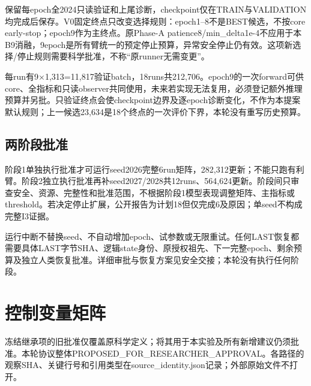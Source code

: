 \documentclass[UTF8,fontset=fandol,10pt]{ctexart}
\begin{document}
保留每epoch全2024只读验证和上尾诊断，checkpoint仅在TRAIN与VALIDATION均完成后保存。V0固定终点只改变选择规则：epoch1–8不是BEST候选，不按core early-stop；epoch9作为主终点。原Phase-A patience8/\allowbreak{}min\_\allowbreak{}delta1e-4不应用于本B9消融，9epoch是所有臂统一的预定停止预算，异常安全停止仍有效。这项新选择/\allowbreak{}停止规则需要科学批准，不称“原runner无需变更”。

每run有9\(\times\)1,313=11,817验证batch，18runs共212,706。epoch9的一次forward可供core、全指标和只读observer共同使用，未来若实现无法复用，必须登记额外推理预算并另批。只验证终点会使checkpoint边界及逐epoch诊断变化，不作为本提案默认规则；上一候选23,634是18个终点的一次评价下界，本轮没有重写历史预算。

\subsection{两阶段批准}

阶段1单独执行批准才可运行seed2026完整6run矩阵，282,312更新；不能只跑有利臂。阶段2独立执行批准再补seed2027/\allowbreak{}2028共12runs、564,624更新。阶段间只审查安全、资源、完整性和批准范围，不根据阶段1模型表现调整矩阵、主指标或threshold。若决定停止扩展，公开报告为计划18但仅完成6及原因；单seed不构成完整I3证据。

运行中断不替换seed、不自动增加epoch、试参数或无限重试。任何LAST恢复都需要具体LAST字节SHA、逻辑state身份、原授权祖先、下一完整epoch、剩余预算及独立人类恢复批准。详细审批与恢复方案见安全交接；本轮没有执行任何阶段。
\clearpage\section{控制变量矩阵}

冻结继承项的旧批准仅覆盖原科学定义；将其用于本实验及所有新增建议仍须批准。本轮协议整体PROPOSED\_\allowbreak{}FOR\_\allowbreak{}RESEARCHER\_\allowbreak{}APPROVAL。各路径的观察SHA、关键行号和引用类型在source\_\allowbreak{}identity.json记录；外部原始文件不打开。
\end{document}

